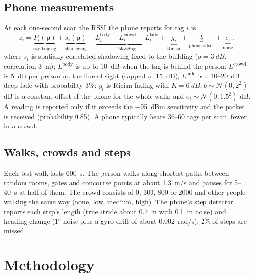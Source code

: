 \documentclass[11pt,a4paper]{article}
\begin{document}
\subsection{Phone measurements}
At each one-second scan the RSSI the phone reports for tag $i$ is
\begin{equation}
  z_i = \underbrace{P_i(\mathbf{p})}_{\text{ray tracing}}
      + \underbrace{s_i(\mathbf{p})}_{\text{shadowing}}
      - \underbrace{L^{\text{body}}_i - L^{\text{crowd}}_i - L^{\text{fade}}_i}_{\text{blocking}}
      + \underbrace{g_i}_{\text{Rician}}
      + \underbrace{b}_{\text{phone offset}}
      + \underbrace{e_i}_{\text{noise}},
  \label{eq:simulator}
\end{equation}
where $s_i$ is spatially correlated shadowing fixed to the building
($\sigma=\SI{3}{dB}$, correlation \SI{3}{m}); $L^{\text{body}}$ is up to \SI{10}{dB} when
the tag is behind the person; $L^{\text{crowd}}$ is \SI{5}{dB} per person on the line of
sight (capped at \SI{15}{dB}); $L^{\text{fade}}$ is a 10--\SI{20}{dB} deep fade with
probability 3\%; $g_i$ is Rician fading with $K=\SI{6}{dB}$; $b\sim\mathcal{N}(0,2^2)$ dB
is a constant offset of the phone for the whole walk; and $e_i\sim\mathcal{N}(0,1.5^2)$
dB. A reading is reported only if it exceeds the \SI{-95}{dBm} sensitivity and the packet
is received (probability 0.85). A phone typically hears 36--60 tags per scan, fewer in a crowd.

\subsection{Walks, crowds and steps}
Each test walk lasts \SI{600}{s}. The person walks along shortest paths between random
rooms, gates and concourse points at about \SI{1.3}{m/s} and pauses for 5--\SI{40}{s} at
half of them. The crowd consists of 0, 300, 800 or 2000 and other people walking the same way
(none, low, medium, high). The phone's step detector reports each step's length (true
stride about \SI{0.7}{m} with \SI{0.1}{m} noise) and heading change (\ang{1} noise plus a
gyro drift of about \SI{0.002}{rad/s}); 2\% of steps are missed.


\section{Methodology}
\label{sec:method}
\end{document}
